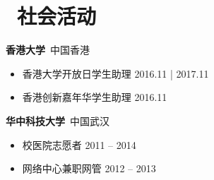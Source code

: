 \documentclass{resume}
\begin{document}
\section{\faInfo\ 社会活动}
\textbf{香港大学}~中国香港
\begin{itemize}
  \item 香港大学开放日学生助理 \hfill 2016.11 | 2017.11
  \item 香港创新嘉年华学生助理 \hfill 2016.11
\end{itemize}

\vspace*{.1in}
\textbf{华中科技大学}~中国武汉
\begin{itemize}
  \item 校医院志愿者 \hfill 2011 -- 2014
  \item 网络中心兼职网管 \hfill 2012 -- 2013
\end{itemize}
\end{document}
